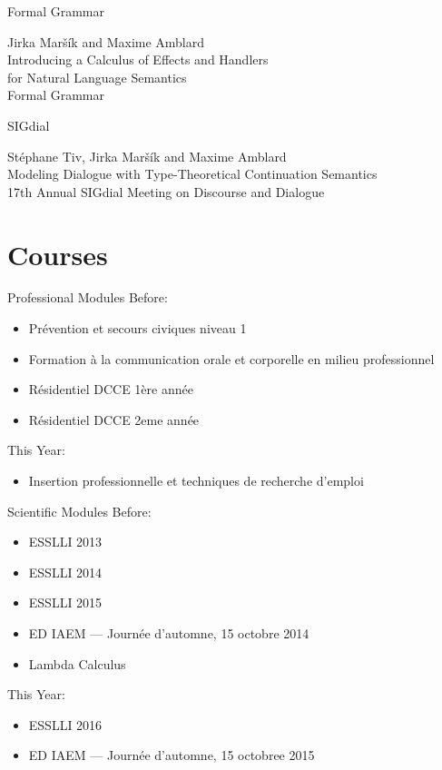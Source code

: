 \documentclass{beamer}
\begin{document}
\begin{frame}{Formal Grammar}
\begin{center}
  Jirka Maršík and Maxime Amblard \\
  Introducing a Calculus of Effects and Handlers \\
  for Natural Language Semantics \\
  Formal Grammar
\end{center}
\end{frame}

\begin{frame}{SIGdial}
\begin{center}
  Stéphane Tiv, Jirka Maršík and Maxime Amblard \\
  Modeling Dialogue with Type-Theoretical Continuation Semantics \\
  17th Annual SIGdial Meeting on Discourse and Dialogue
\end{center}
\end{frame}

\section{Courses}

\begin{frame}{Professional Modules}
  Before:
  \begin{itemize}
  \item Prévention et secours civiques niveau 1
  \item Formation à la communication orale et corporelle en milieu
    professionnel 
  \item Résidentiel DCCE 1ère année
  \item Résidentiel DCCE 2eme année
  \end{itemize}
  
  This Year:
  \begin{itemize}
  \item Insertion professionnelle et techniques de recherche d'emploi 
  \end{itemize}
\end{frame}

\begin{frame}{Scientific Modules}
  Before:
  \begin{itemize}
  \item ESSLLI 2013
  \item ESSLLI 2014
  \item ESSLLI 2015
  \item ED IAEM --- Journée d'automne, 15 octobre 2014
  \item Lambda Calculus
  \end{itemize}
  
  This Year:
  \begin{itemize}
  \item ESSLLI 2016
  \item ED IAEM --- Journée d'automne, 15 octobree 2015
  \end{itemize}
\end{frame}
\end{document}
